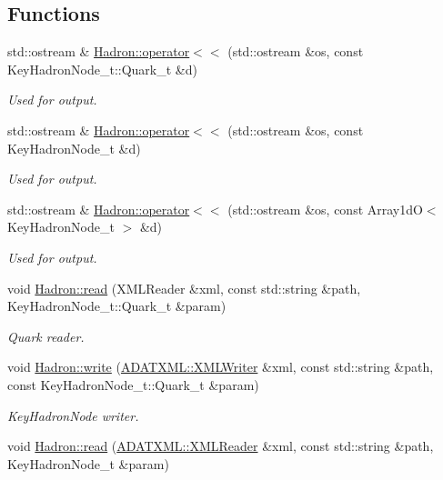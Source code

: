 \subsection*{Functions}
\begin{DoxyCompactItemize}
\item 
std\+::ostream \& \mbox{\hyperlink{namespaceHadron_a0c52fe94d4afb343c44206908152316e}{Hadron\+::operator$<$$<$}} (std\+::ostream \&os, const Key\+Hadron\+Node\+\_\+t\+::\+Quark\+\_\+t \&d)
\begin{DoxyCompactList}\small\item\em Used for output. \end{DoxyCompactList}\item 
std\+::ostream \& \mbox{\hyperlink{namespaceHadron_accc8a0a89713671c3a48ac45536eac45}{Hadron\+::operator$<$$<$}} (std\+::ostream \&os, const Key\+Hadron\+Node\+\_\+t \&d)
\begin{DoxyCompactList}\small\item\em Used for output. \end{DoxyCompactList}\item 
std\+::ostream \& \mbox{\hyperlink{namespaceHadron_a243db37c66ec71b086f54a64d62fa659}{Hadron\+::operator$<$$<$}} (std\+::ostream \&os, const Array1dO$<$ Key\+Hadron\+Node\+\_\+t $>$ \&d)
\begin{DoxyCompactList}\small\item\em Used for output. \end{DoxyCompactList}\item 
void \mbox{\hyperlink{namespaceHadron_a6eef93fdb3fe356c6326b6e8e0757ccb}{Hadron\+::read}} (X\+M\+L\+Reader \&xml, const std\+::string \&path, Key\+Hadron\+Node\+\_\+t\+::\+Quark\+\_\+t \&param)
\begin{DoxyCompactList}\small\item\em Quark reader. \end{DoxyCompactList}\item 
void \mbox{\hyperlink{namespaceHadron_aa7f9575393c93afa7db5f164da5c31eb}{Hadron\+::write}} (\mbox{\hyperlink{classADATXML_1_1XMLWriter}{A\+D\+A\+T\+X\+M\+L\+::\+X\+M\+L\+Writer}} \&xml, const std\+::string \&path, const Key\+Hadron\+Node\+\_\+t\+::\+Quark\+\_\+t \&param)
\begin{DoxyCompactList}\small\item\em Key\+Hadron\+Node writer. \end{DoxyCompactList}\item 
void \mbox{\hyperlink{namespaceHadron_acbb0293cc9773c6009050757b471c4d8}{Hadron\+::read}} (\mbox{\hyperlink{classADATXML_1_1XMLReader}{A\+D\+A\+T\+X\+M\+L\+::\+X\+M\+L\+Reader}} \&xml, const std\+::string \&path, Key\+Hadron\+Node\+\_\+t \&param)

\end{DoxyCompactItemize}
